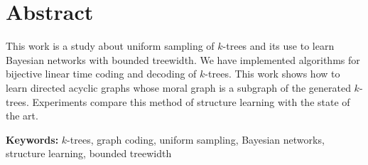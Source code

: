 \chapter*{Abstract}

This work is a study about uniform sampling of $k$-trees and its use to learn Bayesian networks with bounded treewidth. We have implemented algorithms for bijective linear time coding and decoding of $k$-trees. This work shows how to learn directed acyclic graphs whose moral graph is a subgraph of the generated $k$-trees. Experiments compare this method of structure learning with the state of the art.

\vspace{1em}

\noindent \textbf{Keywords:} $k$-trees, graph coding, uniform sampling, Bayesian networks, structure learning, bounded treewidth

